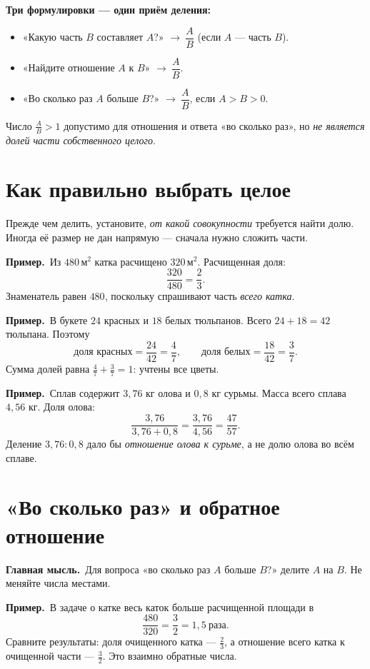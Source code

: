 \documentclass[a4paper,12pt]{article}
\newcommand{\keyidea}[1]{\textcolor{darkaccent}{\textbf{Главная мысль.}}\ #1}
\newcommand{\ex}[1]{\par\textcolor{darkaccent}{\textbf{Пример.}}\ #1}
\begin{document}
\textbf{Три формулировки --- один приём деления:}
\begin{itemize}
\item «Какую часть $B$ составляет $A$?» $\longrightarrow\ \dfrac{A}{B}$ (если $A$ --- часть $B$).
\item «Найдите отношение $A$ к $B$» $\longrightarrow\ \dfrac{A}{B}$.
\item «Во сколько раз $A$ больше $B$?» $\longrightarrow\ \dfrac{A}{B}$, если $A>B>0$.
\end{itemize}
Число $\frac{A}{B}>1$ допустимо для отношения и ответа «во сколько раз», но \emph{не является долей части собственного целого}.

\section{Как правильно выбрать целое}

Прежде чем делить, установите, \emph{от какой совокупности} требуется найти долю. Иногда её размер не дан напрямую --- сначала нужно сложить части.

\ex{Из $480\,\text{м}^2$ катка расчищено $320\,\text{м}^2$. Расчищенная доля:}
\[
\frac{320}{480}=\frac{2}{3}.
\]
Знаменатель равен $480$, поскольку спрашивают часть \emph{всего катка}.

\ex{В букете $24$ красных и $18$ белых тюльпанов. Всего $24+18=42$ тюльпана. Поэтому}
\[
\text{доля красных}=\frac{24}{42}=\frac47,\qquad
\text{доля белых}=\frac{18}{42}=\frac37.
\]
Сумма долей равна $\frac47+\frac37=1$: учтены все цветы.

\ex{Сплав содержит $3{,}76$ кг олова и $0{,}8$ кг сурьмы. Масса всего сплава $4{,}56$ кг. Доля олова:}
\[
\frac{3{,}76}{3{,}76+0{,}8}=\frac{3{,}76}{4{,}56}=\frac{47}{57}.
\]
Деление $3{,}76:0{,}8$ дало бы \emph{отношение олова к сурьме}, а не долю олова во всём сплаве.

\section{«Во сколько раз» и обратное отношение}

\keyidea{Для вопроса «во сколько раз $A$ больше $B$?» делите $A$ на $B$. Не меняйте числа местами.}

\ex{В задаче о катке весь каток больше расчищенной площади в}
\[
\frac{480}{320}=\frac32=1{,}5\ \text{раза}.
\]
Сравните результаты: доля очищенного катка --- $\frac23$, а отношение всего катка к очищенной части --- $\frac32$. Это взаимно обратные числа.
\end{document}
